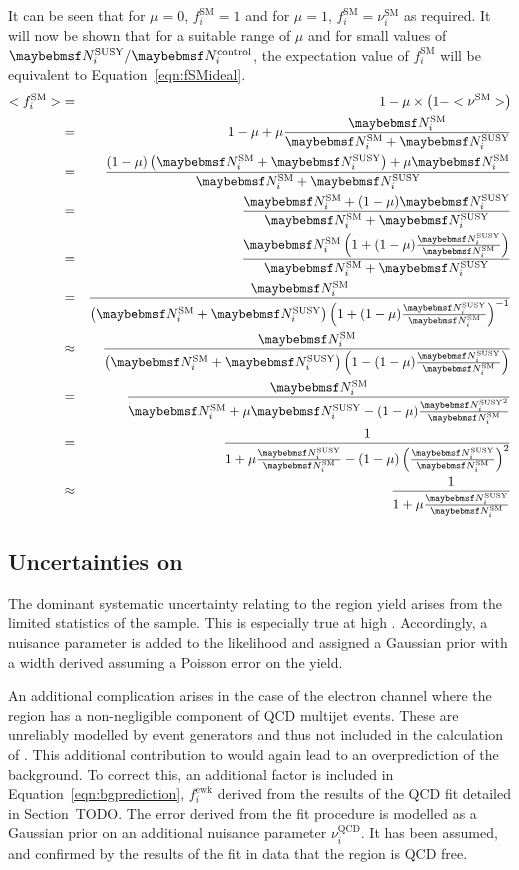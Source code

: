 It can be seen that for $\mu=0$, $f^{\textrm{SM}}_i=1$ and for $\mu=1$,
$f^{\textrm{SM}}_i=\nu^{\textrm{SM}}_i$ as required. It will now be shown that
for a suitable range of $\mu$ and for small values of $\NSUSYi/\NControli$, the
expectation value of $f^{\textrm{SM}}_i$ will be equivalent to
Equation~\ref{eqn:fSMideal}.
\begin{eqnarray*}
<f^{\textrm{SM}}_i> &=& 1 - \mu \times \left(1-<\nu^{\textrm{SM}}>\right) \\
                  &=& 1 - \mu  + \mu\frac{\NSMi}{\NSMi + \NSUSYi} \\
                  &=& \frac{(1-\mu)\left(\NSMi + \NSUSYi\right) + \mu\NSMi}{\NSMi + \NSUSYi} \\
                  &=& \frac{\NSMi + (1 - \mu)\NSUSYi}{\NSMi + \NSUSYi} \\
                  &=& \frac{\NSMi \left( 1 + (1-\mu)\frac{\NSUSYi}{\NSMi}\right)}{\NSMi + \NSUSYi} \\
                  &=& \frac{\NSMi}{\left(\NSMi +\NSUSYi\right)\left( 1 + (1 - \mu)\frac{\NSUSYi}{\NSMi}\right)^{-1}} \\
                  &\approx& \frac{\NSMi}{\left(\NSMi +\NSUSYi\right)\left( 1 - (1-\mu)\frac{\NSUSYi}{\NSMi}\right)} \\
                  &=& \frac{\NSMi}{\NSMi + \mu\NSUSYi - (1-\mu)\frac{\NSUSYi^2}{\NSMi}}\\
                  &=& \frac{1}{1 + \mu\frac{\NSUSYi}{\NSMi} - (1-\mu)\left(\frac{\NSUSYi}{\NSMi}\right)^2} \\
                  &\approx& \frac{1}{1 + \mu\frac{\NSUSYi}{\NSMi}}
\end{eqnarray*}

\subsection{Uncertainties on \NControli}
The dominant systematic uncertainty relating to the \LPcontrol region yield
arises from the limited statistics of the sample. This is especially true at
high \STlep. Accordingly, a nuisance parameter is added to the likelihood and
assigned a Gaussian prior with a width derived assuming a Poisson error on the
\NControli yield.

An additional complication arises in the case of the electron channel where the
\LPcontrol region has a non-negligible component of \ac{QCD} multijet
events. These are unreliably modelled by event generators and thus not included
in the calculation of \RCSi. This additional contribution to \NControli would
again lead to an overprediction of the background. To correct this, an
additional factor is included in Equation~\ref{eqn:bgprediction},
$f^{\textrm{ewk}}_i$ derived from the results of the \ac{QCD} fit detailed in
Section~TODO. The error derived from the fit procedure is modelled as a
Gaussian prior on an additional nuisance parameter $\nu^{\textrm{QCD}}_i$. It
has been assumed, and confirmed by the results of the fit in data that the
region \LPsignal is \ac{QCD} free.

